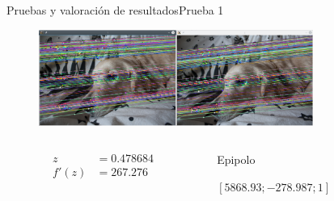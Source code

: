 \documentclass[aspectratio=169,14pt,spanish]{beamer}
\begin{document}
      \begin{frame}{Pruebas y valoración de resultados}{Prueba 1}
          \begin{overlayarea}{\textwidth}{8cm}
               {\begin{figure}[ht!]
                \centering
                \includegraphics[width=0.8\textwidth]{../Informe/Lola-Normal.png}
              \end{figure}

              \begin{columns}
                \begin{column}{0.2\textwidth}
                  \begin{align*}
                    z &= 0.478684 \\
                    f'(z) &= 267.276
                  \end{align*}
                \end{column}
                \begin{column}{0.8\textwidth}
                  Epipolo

                  $[5868.93; -278.987; 1]$
                \end{column}
              \end{columns}


              }
\end{overlayarea}
\end{frame}
\end{document}
